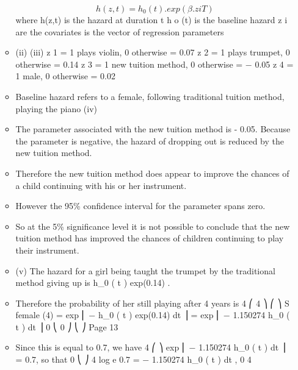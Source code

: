 \documentclass[a4paper,12pt]{article}
\begin{document}
\begin{enumerate}
\begin{itemize}
\[h ( z , t ) = h_{0 }( t ).exp( \beta . z i T )\]
where h(z,t) is the hazard at duration t
h o (t) is the baseline hazard
z i are the covariates
\beta is the vector of regression parameters
\item (ii)
(iii)
z 1 = 1 plays violin, 0 otherwise  = 0.07
z 2 = 1 plays trumpet, 0 otherwise  = 0.14
z 3 = 1 new tuition method, 0 otherwise  = − 0.05
z 4 = 1 male, 0 otherwise  = 0.02
\item Baseline hazard refers to
a female,
following traditional tuition method,
playing the piano
(iv)
\item The parameter associated with the new tuition
method is - 0.05. Because the parameter is negative, the hazard of dropping
out is reduced by the new tuition method.
\item Therefore the new tuition method does appear
to improve the chances of a child continuing
with his or her instrument.
\item However the 95\% confidence interval for the parameter spans zero.
\item So at the 5\% significance level it is not possible to conclude that the new
tuition method has improved the chances of children continuing to play their
instrument.
\item (v)
The hazard for a girl being taught the trumpet by the traditional
method giving up is h_{0 }( t ) exp(0.14) .
\item Therefore the probability of her still playing after 4 years is
4
⎛ 4
⎞
⎛
⎞
S female (4) = exp ⎜ − \int h_{0 }( t ) exp(0.14) dt ⎟ = exp ⎜ − 1.150274 \int h_{0 }( t ) dt ⎟
0
⎝ 0
⎠
⎝
⎠
Page 13%
\item Since this is equal to 0.7, we have
4
⎛
⎞
exp ⎜ − 1.150274 \int h_{0 }( t ) dt ⎟ = 0.7, so that
0
⎝
⎠
4
log e 0.7 = − 1.150274 \int h_{0 }( t ) dt ,
0
4
\end{itemize}


\end{enumerate}
\end{document}
